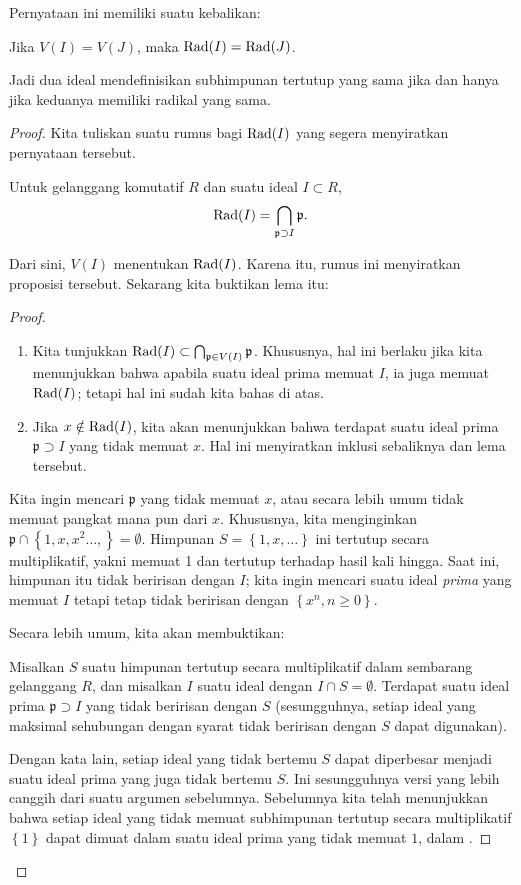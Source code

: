 Pernyataan ini memiliki suatu kebalikan:
\begin{proposition} 
Jika $V(I) = V(J)$, maka $\operatorname{Rad}(I) = \operatorname{Rad}(J)$. 
\end{proposition} 
Jadi dua ideal mendefinisikan subhimpunan tertutup yang sama jika dan hanya jika keduanya memiliki
radikal yang sama.
\begin{proof} 
Kita tuliskan suatu rumus bagi $\operatorname{Rad}(I)$ yang segera menyiratkan
pernyataan tersebut.
\begin{lemma} \label{radprimescontaining} Untuk gelanggang komutatif $R$ dan suatu
ideal $I \subset
R$,
\[ \operatorname{Rad}(I) = \bigcap_{\mathfrak{p} \supset I} \mathfrak{p}.  \]
\end{lemma} 
Dari sini, $V(I)$ menentukan $\operatorname{Rad}(I)$. Karena itu, rumus ini
menyiratkan
proposisi tersebut.  
Sekarang kita buktikan lema itu:
\begin{proof} 
\begin{enumerate}
\item Kita tunjukkan $\operatorname{Rad}(I) \subset \bigcap_{\mathfrak{p} \in V(I)}
\mathfrak{p} $. Khususnya,
hal ini berlaku jika kita menunjukkan bahwa apabila suatu ideal prima memuat
$I$, ia juga memuat $\operatorname{Rad}(I)$; tetapi hal ini sudah kita
bahas di atas.  
\item Jika $x \notin \operatorname{Rad}(I)$, kita akan menunjukkan bahwa terdapat suatu ideal
prima $\mathfrak{p}
\supset I$ yang tidak memuat $x$. Hal ini menyiratkan inklusi
sebaliknya dan
lema tersebut.  
\end{enumerate}


Kita ingin mencari $\mathfrak{p}$ yang tidak memuat $x$, atau secara lebih
umum tidak
memuat pangkat mana pun dari $x$. Khususnya, kita menginginkan
$\mathfrak{p} \cap \left\{1,
x, x^2 \dots, \right\} = \emptyset$. Himpunan $S = \left\{1, x,
\dots\right\}$ ini
tertutup secara multiplikatif, yakni memuat 1 dan tertutup
terhadap
hasil kali hingga. Saat ini, himpunan itu tidak beririsan dengan $I$; kita ingin mencari
suatu ideal
\emph{prima} yang memuat $I$ tetapi tetap tidak beririsan dengan $\left\{x^n, n
\geq 0\right\}$.


Secara lebih umum, kita akan membuktikan:

\begin{sublemma}\label{sublemmamultclosed}
Misalkan $S$ suatu himpunan tertutup secara multiplikatif dalam sembarang gelanggang $R$, dan misalkan
$I$ suatu ideal dengan $I \cap S =
\emptyset$. Terdapat suatu ideal prima $\mathfrak{p} \supset I$ yang
tidak
beririsan dengan $S$ (sesungguhnya, setiap ideal yang maksimal sehubungan dengan syarat
tidak beririsan dengan $S$ dapat digunakan).  
\end{sublemma}
Dengan kata lain, setiap ideal yang tidak bertemu $S$ dapat diperbesar menjadi suatu ideal
prima yang juga tidak bertemu $S$.
Ini sesungguhnya versi yang lebih canggih dari suatu argumen sebelumnya. Sebelumnya kita
telah menunjukkan bahwa setiap ideal yang tidak
memuat subhimpunan tertutup secara multiplikatif $\left\{1\right\}$
dapat
dimuat dalam suatu ideal prima yang tidak memuat $1$, dalam
.


\end{proof}
\end{proof}
